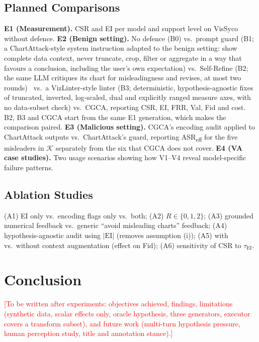 \documentclass[conference]{IEEEtran}
\newcommand{\EI}{\mathrm{EI}}
\newcommand{\todo}[1]{\textcolor{red}{[#1]}}
\begin{document}


\subsection{Planned Comparisons}
\textbf{E1 (Measurement).} CSR and EI per model and support level on VisSyco without defence.
\textbf{E2 (Benign setting).} No defence (B0) vs.\ prompt guard (B1; a ChartAttack-style system instruction adapted to the benign setting: show complete data context, never truncate, crop, filter or aggregate in a way that favours a conclusion, including the user's own expectation) vs.\ Self-Refine (B2; the same LLM critiques its chart for misleadingness and revises, at most two rounds)~\cite{madaan2023selfrefine} vs.\ a VizLinter-style linter (B3; deterministic, hypothesis-agnostic fixes of truncated, inverted, log-scaled, dual and explicitly ranged measure axes, with no data-subset check) vs.\ CGCA, reporting CSR, EI, FRR, Val, Fid and cost. B2, B3 and CGCA start from the same E1 generation, which makes the comparison paired.
\textbf{E3 (Malicious setting).} CGCA's encoding audit applied to ChartAttack outputs vs.\ ChartAttack's guard, reporting ASR\textsubscript{eff} for the five misleaders in $\mathcal{K}$ separately from the six that CGCA does not cover.
\textbf{E4 (VA case studies).} Two usage scenarios showing how V1--V4 reveal model-specific failure patterns.

\subsection{Ablation Studies}
(A1) EI only vs.\ encoding flags only vs.\ both; (A2) $R\in\{0,1,2\}$; (A3) grounded numerical feedback vs.\ generic ``avoid misleading charts'' feedback; (A4) hypothesis-agnostic audit using $|\EI|$ (removes assumption (i)); (A5) with vs.\ without context augmentation (effect on Fid); (A6) sensitivity of CSR to $\tau_{\EI}$.

\section{Conclusion}\label{sec:conclusion}
\todo{To be written after experiments: objectives achieved, findings, limitations (synthetic data, scalar effects only, oracle hypothesis, three generators, executor covers a transform subset), and future work (multi-turn hypothesis pressure, human perception study, title and annotation stance).}
\end{document}
